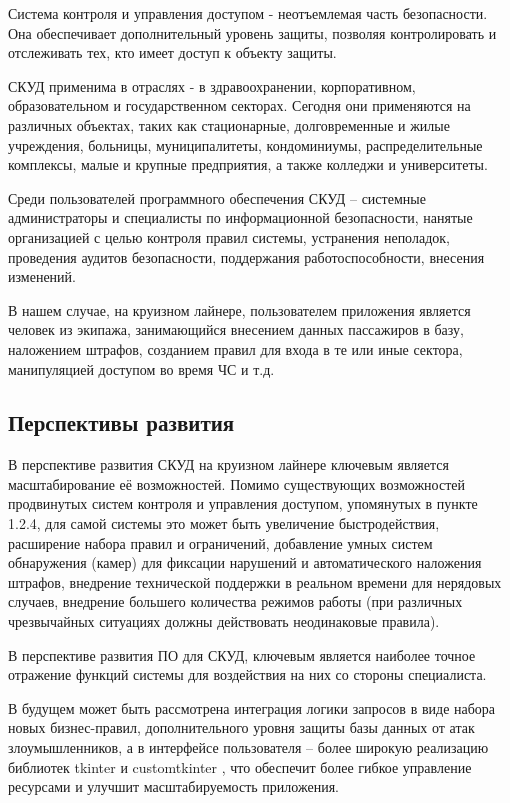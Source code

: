 Система контроля и управления доступом - неотъемлемая часть безопасности. Она обеспечивает дополнительный уровень защиты, позволяя контролировать и отслеживать тех, кто имеет доступ к объекту защиты.

СКУД применима в отраслях - в здравоохранении, корпоративном, образовательном и государственном секторах. Сегодня они применяются на различных объектах, таких как стационарные, долговременные и жилые учреждения, больницы, муниципалитеты, кондоминиумы, распределительные комплексы, малые и крупные предприятия, а также колледжи и университеты.

Среди пользователей программного обеспечения СКУД -- системные администраторы и специалисты по информационной безопасности, нанятые организацией с целью контроля правил системы, устранения неполадок, проведения аудитов безопасности, поддержания работоспособности, внесения изменений.

В нашем случае, на круизном лайнере, пользователем приложения является человек из экипажа, занимающийся внесением данных пассажиров в базу, наложением штрафов, созданием правил для входа в те или иные сектора, манипуляцией доступом во время ЧС и т.д.

\subsection{Перспективы развития}
В перспективе развития СКУД на круизном лайнере ключевым является масштабирование её возможностей. Помимо существующих возможностей продвинутых систем контроля и управления доступом, упомянутых в пункте 1.2.4, для самой системы это может быть увеличение быстродействия, расширение набора правил и ограничений, добавление умных систем обнаружения (камер) для фиксации нарушений и автоматического наложения штрафов, внедрение технической поддержки в реальном времени для нерядовых случаев, внедрение большего количества режимов работы (при различных чрезвычайных ситуациях должны действовать неодинаковые правила).

В перспективе развития ПО для СКУД, ключевым является наиболее точное отражение функций системы для воздействия на них со стороны специалиста.

В будущем может быть рассмотрена интеграция логики запросов в виде набора новых бизнес-правил, дополнительного уровня защиты базы данных от атак злоумышленников, а в интерфейсе пользователя – более широкую реализацию библиотек \textquotedbl tkinter \textquotedbl и \textquotedbl customtkinter \textquotedbl, что обеспечит более гибкое управление ресурсами и улучшит масштабируемость приложения.

